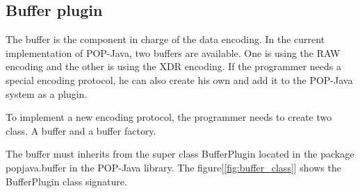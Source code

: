 \pagebreak
\subsection{Buffer plugin}
The buffer is the component in charge of the data encoding. In the current implementation of POP-Java, two buffers are available. One is using the RAW encoding and the other is using the XDR encoding. If the programmer needs a special encoding protocol, he can also create his own and add it to the POP-Java system as a plugin. \s

To implement a new encoding protocol, the programmer needs to create two class. A buffer and a buffer factory. \s

The buffer must inherits from the super class BufferPlugin located in the package popjava.buffer in the POP-Java library. The figure[\ref{fig:buffer_class}] shows the BufferPlugin class signature.
